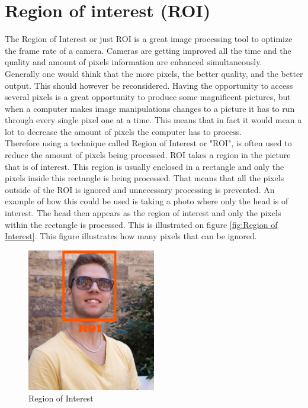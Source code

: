 \section{Region of interest (ROI)}
The Region of Interest or just ROI is a great image processing tool to optimize the frame rate of a camera. Cameras are getting improved all the time and the quality and amount of pixels information are enhanced simultaneously.\\
Generally one would think that the more pixels, the better quality, and the better output. This should however be reconsidered. Having the opportunity to access several pixels is a great opportunity to produce some magnificent pictures, but when a computer makes image manipulations changes to a picture it has to run through every single pixel one at a time. This means that in fact it would mean a lot to decrease the amount of pixels the computer has to process.\\
Therefore using a technique called Region of Interest or "ROI", is often used to reduce the amount of pixels being processed. ROI takes a region in the picture that is of interest. This region is usually enclosed in a rectangle and only the pixels inside this rectangle is being processed. That means that all the pixels outside of the ROI is ignored and unnecessary processing is prevented.
An example of how this could be used is taking a photo where only the head is of interest. The head then appears as the region of interest and only the pixels within the rectangle is processed. This is illustrated on figure \eqref{fig:Region of Interest}. This figure illustrates how many pixels that can be ignored.

\begin{figure}[htbp] 
\centering 
\includegraphics[width=0.5\textwidth]{Pictures/Theory/RegionOfInterest.jpg} 
\caption{Region of Interest} 
\label{fig:Region of Interest} 
\end{figure} 

